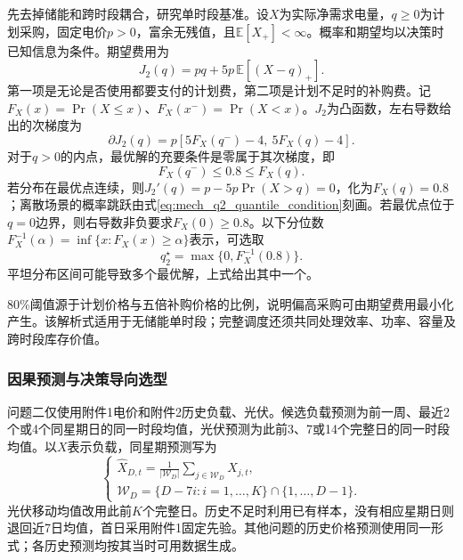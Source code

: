 先去掉储能和跨时段耦合，研究单时段基准。设$X$为实际净需求电量，$q\ge0$为计划采购，固定电价$p>0$，富余无残值，且$\mathbb E[X_+]<\infty$。概率和期望均以决策时已知信息为条件。期望费用为
\begin{equation}
 J_2(q)=pq+5p\,\mathbb E[(X-q)_+].
 \label{eq:mech_q2_cost}
\end{equation}
第一项是无论是否使用都要支付的计划费，第二项是计划不足时的补购费。记$F_X(x)=\Pr(X\le x)$、$F_X(x^-)=\Pr(X<x)$。$J_2$为凸函数，左右导数给出的次梯度为
\begin{equation}
 \partial J_2(q)=p[5F_X(q^-)-4,\ 5F_X(q)-4].
 \label{eq:mech_q2_subgradient}
\end{equation}
对于$q>0$的内点，最优解的充要条件是零属于其次梯度，即
\begin{equation}
 F_X(q^-)\le0.8\le F_X(q).
 \label{eq:mech_q2_quantile_condition}
\end{equation}
若分布在最优点连续，则$J_2'(q)=p-5p\Pr(X>q)=0$，化为$F_X(q)=0.8$；离散场景的概率跳跃由式\eqref{eq:mech_q2_quantile_condition}刻画。若最优点位于$q=0$边界，则右导数非负要求$F_X(0)\ge0.8$。以下分位数$F_X^{-1}(\alpha)=\inf\{x:F_X(x)\ge\alpha\}$表示，可选取
\begin{equation}
 q_2^\star=\max\{0,F_X^{-1}(0.8)\}.
 \label{eq:mech_q2_quantile}
\end{equation}
平坦分布区间可能导致多个最优解，上式给出其中一个。

80\%阈值源于计划价格与五倍补购价格的比例，说明偏高采购可由期望费用最小化产生。该解析式适用于无储能单时段；完整调度还须共同处理效率、功率、容量及跨时段库存价值。

\subsubsection{因果预测与决策导向选型}

问题二仅使用附件1电价和附件2历史负载、光伏。候选负载预测为前一周、最近2个或4个同星期日的同一时段均值，光伏预测为此前3、7或14个完整日的同一时段均值。以$X$表示负载，同星期预测写为
\begin{equation}
 \begin{cases}
 \displaystyle\widehat X_{D,t}=\frac{1}{|\mathcal W_D|}\sum_{j\in\mathcal W_D}X_{j,t},\\
 \mathcal W_D=\{D-7i:i=1,\ldots,K\}\cap\{1,\ldots,D-1\}.
 \end{cases}
 \label{eq:weekday_forecast}
\end{equation}
光伏移动均值改用此前$K$个完整日。历史不足时利用已有样本，没有相应星期日则退回近7日均值，首日采用附件1固定先验。其他问题的历史价格预测使用同一形式；各历史预测均按其当时可用数据生成。

